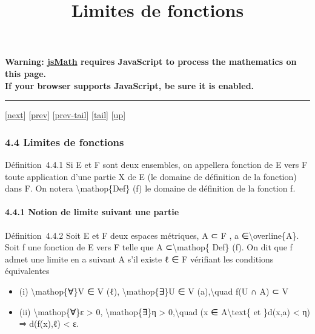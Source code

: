 \documentclass[]{article}
\title{Limites de fonctions}
\author{}
\date{}
\begin{document}
\maketitle

\textbf{Warning: \href{http://www.math.union.edu/locate/jsMath}{jsMath}
requires JavaScript to process the mathematics on this page.\\ If your
browser supports JavaScript, be sure it is enabled.}

\begin{center}\rule{3in}{0.4pt}\end{center}

{[}\href{coursse22.html}{next}{]} {[}\href{coursse20.html}{prev}{]}
{[}\href{coursse20.html\#tailcoursse20.html}{prev-tail}{]}
{[}\hyperref[tailcoursse21.html]{tail}{]}
{[}\href{coursch5.html\#coursse21.html}{up}{]}

\subsubsection{4.4 Limites de fonctions}

Définition~4.4.1 Si E et F sont deux ensembles, on appellera fonction de
E vers F toute application d'une partie X de E (le domaine de définition
de la fonction) dans F. On notera \textbackslash{}mathop\{Def\} (f) le
domaine de définition de la fonction f.

\paragraph{4.4.1 Notion de limite suivant une partie}

Définition~4.4.2 Soit E et F deux espaces métriques, A ⊂ F , a
∈\textbackslash{}overline\{A\}. Soit f une fonction de E vers F telle
que A ⊂\textbackslash{}mathop\{ Def\} (f). On dit que f admet une limite
en a suivant A s'il existe ℓ ∈ F vérifiant les conditions équivalentes

\begin{itemize}
\itemsep1pt\parskip0pt
\item
  (i) \textbackslash{}mathop\{∀\}V ∈ V (ℓ), \textbackslash{}mathop\{∃\}U
  ∈ V (a),\textbackslash{}quad f(U ∩ A) ⊂ V
\item
  (ii) \textbackslash{}mathop\{∀\}ε \textgreater{} 0,
  \textbackslash{}mathop\{∃\}η \textgreater{} 0,\textbackslash{}quad (x
  ∈ A\textbackslash{}text\{ et \}d(x,a) \textless{} η) ⇒ d(f(x),ℓ)
  \textless{} ε.
\end{itemize}
\end{document}
